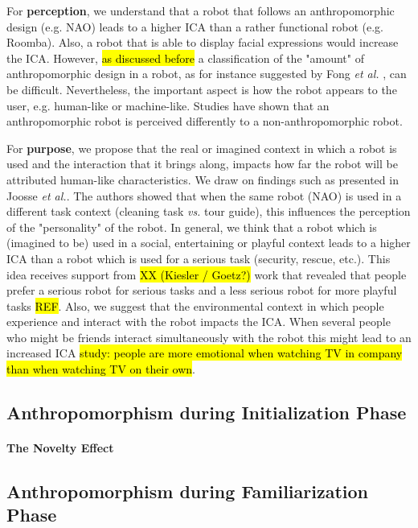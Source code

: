 \documentclass[lettersize, apacite, twoside, HRI]{apa_HRI}
\begin{document}
	For \textbf{perception}, we understand that a robot that follows an anthropomorphic design (e.g. NAO) leads to a higher ICA than a rather functional robot (e.g. Roomba). Also, a robot that is able to display facial expressions would increase the ICA. However, \hl{as discussed before} a classification of the "amount" of anthropomorphic design in a robot, as for instance suggested by Fong \textit{et al.} \cite{fong_survey_2003}, can be difficult. Nevertheless, the important aspect is how the robot appears to the user, e.g. human-like or machine-like. Studies have shown that an anthropomorphic robot is perceived differently to a non-anthropomorphic robot.
	
	For \textbf{purpose}, we propose that the real or imagined context in which a robot is used and the interaction that it brings along, impacts how far the robot will be attributed human-like characteristics. We	draw on findings such as presented in Joosse \textit{et al.}. The authors showed that when the same robot (NAO) is used in a different task context (cleaning task \textit{vs.} tour guide), this influences the perception of the "personality" of the robot. In general, we think that a robot which is (imagined to be) used in a social, entertaining or playful context leads to a higher ICA than a robot which is used for a serious task (security, rescue, etc.). This idea receives support from \hl{XX (Kiesler / Goetz?)} work that revealed that people prefer a serious robot for serious tasks and a less serious robot for more playful tasks \hl{REF}. Also, we suggest that the environmental context in which people experience and interact with the robot impacts the ICA. When several people who might be friends interact simultaneously with the robot this might lead to an increased ICA \hl{study: people are more emotional when watching TV in company than when watching TV on their own}.

\subsection{Anthropomorphism during Initialization Phase}
\label{sec:initialization}

\paragraph{The Novelty Effect}
\label{sec:noveltyeffect}

\subsection{Anthropomorphism during Familiarization Phase}
\label{sec:familiarization}
\end{document}
